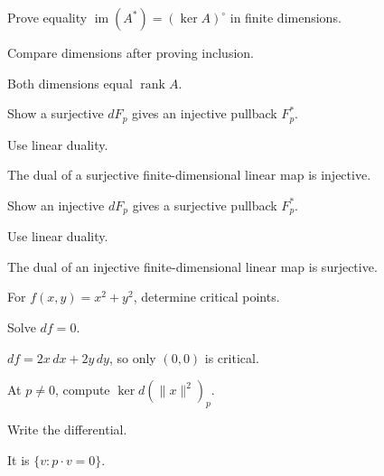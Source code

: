 \begin{exercise}\label{exr:vii05-17}
Prove equality \(\operatorname{im}(A^*)=(\ker A)^\circ\) in finite dimensions.
\end{exercise}
\begin{hint}
Compare dimensions after proving inclusion.
\end{hint}
\begin{solution}
Both dimensions equal \(\operatorname{rank}A\).
\end{solution}

\begin{exercise}\label{exr:vii05-18}
Show a surjective \(dF_p\) gives an injective pullback \(F_p^*\).
\end{exercise}
\begin{hint}
Use linear duality.
\end{hint}
\begin{solution}
The dual of a surjective finite-dimensional linear map is injective.
\end{solution}

\begin{exercise}\label{exr:vii05-19}
Show an injective \(dF_p\) gives a surjective pullback \(F_p^*\).
\end{exercise}
\begin{hint}
Use linear duality.
\end{hint}
\begin{solution}
The dual of an injective finite-dimensional linear map is surjective.
\end{solution}

\begin{exercise}\label{exr:vii05-20}
For \(f(x,y)=x^2+y^2\), determine critical points.
\end{exercise}
\begin{hint}
Solve \(df=0\).
\end{hint}
\begin{solution}
\(df=2x\,dx+2y\,dy\), so only \((0,0)\) is critical.
\end{solution}

\begin{exercise}\label{exr:vii05-21}
At \(p\neq0\), compute \(\ker d(\|x\|^2)_p\).
\end{exercise}
\begin{hint}
Write the differential.
\end{hint}
\begin{solution}
It is \(\{v:p\cdot v=0\}\).
\end{solution}

